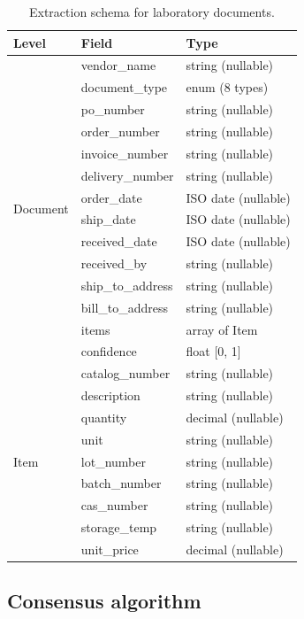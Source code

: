 \documentclass[11pt]{article}
\begin{document}
\begin{table}[ht]
\centering
\caption{Extraction schema for laboratory documents.}
\label{tab:schema}
\small
\begin{tabular}{lll}
\toprule
\textbf{Level} & \textbf{Field} & \textbf{Type} \\
\midrule
\multirow{14}{*}{Document}
  & vendor\_name & string (nullable) \\
  & document\_type & enum (8 types) \\
  & po\_number & string (nullable) \\
  & order\_number & string (nullable) \\
  & invoice\_number & string (nullable) \\
  & delivery\_number & string (nullable) \\
  & order\_date & ISO date (nullable) \\
  & ship\_date & ISO date (nullable) \\
  & received\_date & ISO date (nullable) \\
  & received\_by & string (nullable) \\
  & ship\_to\_address & string (nullable) \\
  & bill\_to\_address & string (nullable) \\
  & items & array of Item \\
  & confidence & float [0, 1] \\
\midrule
\multirow{9}{*}{Item}
  & catalog\_number & string (nullable) \\
  & description & string (nullable) \\
  & quantity & decimal (nullable) \\
  & unit & string (nullable) \\
  & lot\_number & string (nullable) \\
  & batch\_number & string (nullable) \\
  & cas\_number & string (nullable) \\
  & storage\_temp & string (nullable) \\
  & unit\_price & decimal (nullable) \\
\bottomrule
\end{tabular}
\end{table}

\subsection{Consensus algorithm}
\end{document}

